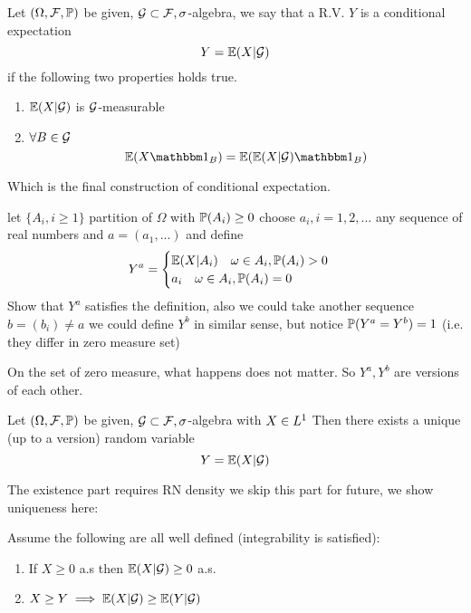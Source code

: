 \newpage
\begin{dfn}
Let $(\Omega, \mathcal{F}, \mathbb{P})$ be given, $\mathcal{G} \subset\mathcal{F},\sigma$-algebra, we say that a R.V. $Y$ is a conditional expectation \begin{equation*}
    Y = \mathbb{E}(X|\mathcal{G})
\end{equation*} if the following two properties holds true. \begin{enumerate}
    \item $\mathbb{E}(X|\mathcal{G})$ is $\mathcal{G}$-measurable
    \item $\forall B\in \mathcal{G}$ \begin{equation*}
        \E(X \I_B) = \E(\E(X|\setg) \I_B)
    \end{equation*}
\end{enumerate}
\end{dfn}Which is the final construction of conditional expectation.
\begin{ex}
let $\{A_i, i\geq1\}$ partition of $\Omega$ with $\mathbb{P}(A_i) \geq 0$ choose $a_i, i=1,2,...$ any sequence of real numbers and $a = (a_1, ...)$ and define 
\begin{equation*}
    Y^a = \begin{cases} \mathbb{E}(X|A_i) \quad \omega\in A_i, \mathbb{P}(A_i)>0 \\
    a_i\quad \omega\in A_i, \mathbb{P}(A_i) = 0
    \end{cases}
\end{equation*}Show that $Y^a$ satisfies the definition, also we could take another sequence $b = (b_i)\neq a$ we could define $Y^b$ in similar sense, but notice $\mathbb{P}(Y^a = Y^b) = 1$ (i.e. they differ in zero measure set)
\end{ex}
\begin{rem}[Versions]
On the set of zero measure, what happens does not matter. So $Y^a, Y^b$ are versions of each other.
\end{rem}

\begin{thm}
Let $(\Omega, \mathcal{F}, \mathbb{P})$ be given, $\mathcal{G} \subset\mathcal{F},\sigma$-algebra with $X\in L^{1}$ Then there exists a unique (up to a version) random variable
\begin{equation*}
    Y = \mathbb{E}(X|\mathcal{G})
\end{equation*}
\end{thm}The existence part requires RN density we skip this part for future, we show uniqueness here:

\begin{cor}
Assume the following are all well defined (integrability is satisfied):
\begin{enumerate}
    \item If $X\geq 0$ a.s then $\mathbb{E}(X|\mathcal{G}) \geq 0$ a.s.
    \item $X \geq Y \implies \mathbb{E}(X|\mathcal{G}) \geq \mathbb{E}(Y|\mathcal{G})$
\end{enumerate}
\end{cor}

